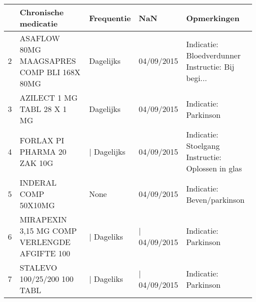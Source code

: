 \begin{tabular}{lllll}
\toprule
{} &                          Chronische medicatie &   Frequentie &           NaN &                                        Opmerkingen \\
\midrule
2 &    ASAFLOW 80MG MAAGSAPRES COMP BLI 168X 80MG &    Dagelijks &    04/09/2015 &  Indicatie: Bloedverdunner Instructie: Bij begi... \\
3 &                   AZILECT 1 MG TABL 28 X 1 MG &    Dagelijks &    04/09/2015 &                               Indicatie: Parkinson \\
4 &                   FORLAX PI PHARMA 20 ZAK 10G &  | Dagelijks &    04/09/2015 &  Indicatie: Stoelgang Instructie: Oplossen in glas \\
5 &                          INDERAL COMP 50X10MG &         None &    04/09/2015 &                         Indicatie: Beven/parkinson \\
6 &  MIRAPEXIN 3,15 MG COMP VERLENGDE AFGIFTE 100 &   | Dageliks &  | 04/09/2015 &                               Indicatie: Parkinson \\
7 &                   STALEVO 100/25/200 100 TABL &   | Dageliks &  | 04/09/2015 &                               Indicatie: Parkinson \\
\bottomrule
\end{tabular}
